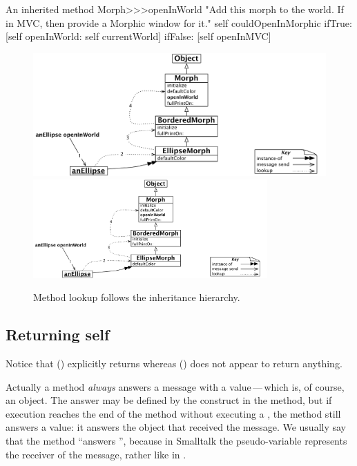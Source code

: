 \documentclass[a4paper,10pt,twoside]{book}
\begin{document}
\begin{method}[openInWorld]{An inherited method}
Morph>>>openInWorld
	"Add this morph to the world.  If in MVC, then provide a Morphic window for it."
	self couldOpenInMorphic
		ifTrue: [self openInWorld: self currentWorld]
		ifFalse: [self openInMVC]
\end{method}

\begin{figure}[htb]
\begin{center}
\ifluluelse
	{\includegraphics[width=\textwidth]{openInWorldLookup}}
	{\includegraphics[width=0.8\textwidth]{openInWorldLookup}}
\caption{Method lookup follows the inheritance hierarchy.}
\end{center}
\end{figure}

\subsection{Returning self}

Notice that  () explicitly returns  whereas  () does not appear to return anything.

Actually a method \emph{always} answers a message with a value\,---\,which is, of course, an object.
The answer may be defined by the \ct{^} construct in the method, but if execution reaches the end of the method without executing a \ct{^}, the method still answers a value: it answers the object that received the message.
We usually say that the method ``answers \self'', because in Smalltalk the pseudo-variable \self represents the receiver of the message, rather like  in .
\end{document}
